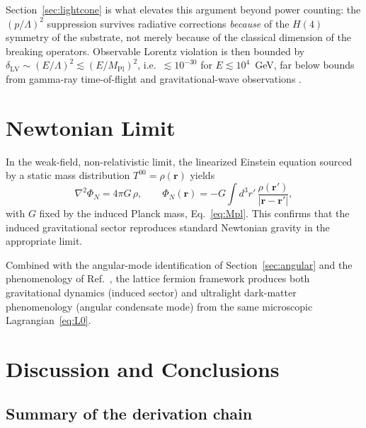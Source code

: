 \documentclass[11pt,a4paper]{article}
\begin{document}
Section~\ref{sec:lightcone} is what elevates this argument beyond
power counting: the $(p/\Lambda)^2$ suppression survives radiative
corrections \emph{because} of the $H(4)$ symmetry of the substrate,
not merely because of the classical dimension of the breaking
operators.
Observable Lorentz violation is then bounded by
$\delta_{\mathrm{LV}} \sim (E/\Lambda)^2 \lesssim
(E/M_{\mathrm{Pl}})^2$, i.e.\ $\lesssim 10^{-30}$ for
$E \lesssim 10^4$~GeV, far below bounds from gamma-ray
time-of-flight and gravitational-wave observations
\cite{Fermi:2009,LIGO:2017}.


\section{Newtonian Limit}
\label{sec:newton}

In the weak-field, non-relativistic limit, the linearized
Einstein equation sourced by a static mass distribution
$T^{00} = \rho(\mathbf{r})$ yields
\begin{equation}
\nabla^2 \Phi_N = 4\pi G\,\rho,
\qquad
\Phi_N(\mathbf{r}) = -G\int d^3r'\,
\frac{\rho(\mathbf{r}')}{|\mathbf{r} - \mathbf{r}'|},
\label{eq:Poisson}
\end{equation}
with $G$ fixed by the induced Planck mass, Eq.~\eqref{eq:Mpl}.
This confirms that the induced gravitational sector reproduces
standard Newtonian gravity in the appropriate limit.

Combined with the angular-mode identification of
Section~\ref{sec:angular} and the phenomenology of
Ref.~\cite{Cheng:2025sparc}, the lattice fermion framework
produces both gravitational dynamics (induced sector) and
ultralight dark-matter phenomenology (angular condensate mode)
from the same microscopic Lagrangian~\eqref{eq:L0}.


\section{Discussion and Conclusions}
\label{sec:discuss}

\subsection{Summary of the derivation chain}
\end{document}
